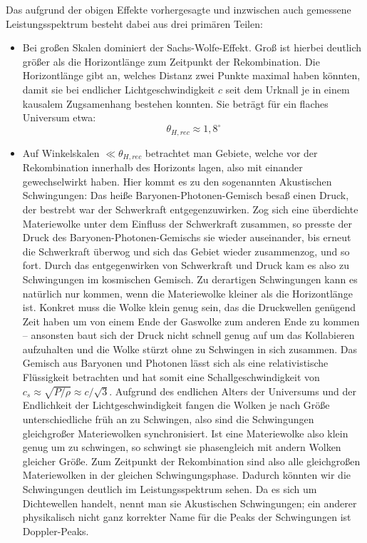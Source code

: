 \documentclass[10pt,a4paper]{article}
\begin{document}
Das aufgrund der obigen Effekte vorhergesagte und inzwischen auch gemessene Leistungsspektrum besteht dabei aus drei primären Teilen:
\begin{itemize}
\item Bei großen Skalen dominiert der Sachs-Wolfe-Effekt. Groß ist hierbei deutlich größer als die Horizontlänge zum Zeitpunkt der Rekombination. Die Horizontlänge gibt an, welches Distanz zwei Punkte maximal haben könnten, damit sie bei endlicher Lichtgeschwindigkeit $c$ seit dem Urknall je in einem kausalem Zugsamenhang bestehen konnten. Sie beträgt für ein flaches Universum etwa:
\[ \theta_{H,rec} \approx 1,8^\circ \]
\item Auf Winkelskalen $\ll\theta_{H,rec}$ betrachtet man Gebiete, welche vor der Rekombination innerhalb des Horizonts lagen, also mit einander gewechselwirkt haben. Hier kommt es zu den sogenannten Akustischen Schwingungen:
Das heiße Baryonen-Photonen-Gemisch besaß einen Druck, der bestrebt war der Schwerkraft entgegenzuwirken. Zog sich eine überdichte Materiewolke unter dem Einfluss der Schwerkraft zusammen, so presste der Druck des Baryonen-Photonen-Gemischs sie wieder auseinander, bis erneut die Schwerkraft überwog und sich das Gebiet wieder zusammenzog, und so fort. Durch das entgegenwirken von Schwerkraft und Druck kam es also zu Schwingungen im kosmischen Gemisch.
Zu derartigen Schwingungen kann es natürlich nur kommen, wenn die Materiewolke kleiner als die Horizontlänge ist. Konkret muss die Wolke klein genug sein, das die Druckwellen genügend Zeit haben um von einem Ende der Gaswolke zum anderen Ende zu kommen -- ansonsten baut sich der Druck nicht schnell genug auf um das Kollabieren aufzuhalten und die Wolke stürzt ohne zu Schwingen in sich zusammen. Das Gemisch aus Baryonen und Photonen lässt sich als eine relativistische Flüssigkeit betrachten und hat somit eine Schallgeschwindigkeit von $c_s\approx\sqrt{P/\rho}\approx c/\sqrt{3}$.\cite{Schneider}
Aufgrund des endlichen Alters der Universums und der Endlichkeit der Lichtgeschwindigkeit fangen die Wolken je nach Größe unterschiedliche früh an zu Schwingen, also sind die Schwingungen gleichgroßer Materiewolken synchronisiert. Ist eine Materiewolke also klein genug um zu schwingen, so schwingt sie phasengleich mit andern Wolken gleicher Größe. Zum Zeitpunkt der Rekombination sind also alle gleichgroßen Materiewolken in der gleichen Schwingungsphase. Dadurch könnten wir die Schwingungen deutlich im Leistungsspektrum sehen. Da es sich um Dichtewellen handelt, nennt man sie Akustischen Schwingungen; ein anderer physikalisch nicht ganz korrekter Name für die Peaks der Schwingungen ist Doppler-Peaks.

\end{itemize}
\end{document}
